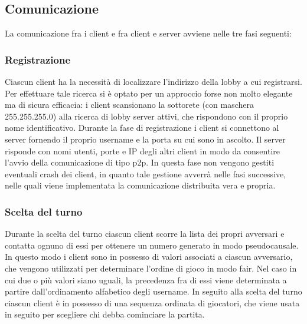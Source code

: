 \subsection{Comunicazione}
La comunicazione fra i client e fra client e server avviene nelle tre fasi seguenti:

\subsubsection{Registrazione}
Ciascun client ha la necessità di localizzare l'indirizzo della lobby a cui 
registrarsi. Per effettuare tale ricerca si è optato per un approccio forse non 
molto elegante ma di sicura efficacia: i client scansionano la sottorete (con 
maschera 255.255.255.0) alla ricerca di lobby server attivi, che rispondono con 
il proprio nome identificativo.
Durante la fase di registrazione i client si connettono al 
server fornendo il proprio username e la porta su cui sono in ascolto. Il 
server risponde con nomi utenti, porte e IP degli altri client in modo da 
consentire l'avvio della comunicazione di tipo p2p. In questa fase non vengono 
gestiti eventuali crash dei client, in quanto tale gestione avverrà nelle fasi 
successive, nelle quali viene implementata la comunicazione distribuita vera e 
propria.
\subsubsection{Scelta del turno}
Durante la scelta del turno ciascun client scorre la lista dei propri 
avversari e contatta ognuno di essi per ottenere un numero generato in modo 
pseudocausale. In questo modo i client sono in possesso di valori associati a 
ciascun avversario, che vengono utilizzati per determinare l'ordine di gioco in 
modo fair. Nel caso in cui due o più valori siano uguali, la precedenza fra di essi 
viene determinata a partire dall'ordinamento alfabetico degli username. In 
seguito alla scelta del turno ciascun client è in possesso di una sequenza 
ordinata di giocatori, che viene usata in seguito per scegliere chi debba 
cominciare la partita.
